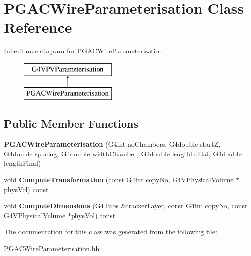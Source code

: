 \hypertarget{classPGACWireParameterisation}{\section{P\-G\-A\-C\-Wire\-Parameterisation Class Reference}
\label{classPGACWireParameterisation}
}
Inheritance diagram for P\-G\-A\-C\-Wire\-Parameterisation\-:\begin{figure}[H]
\begin{center}
\leavevmode
\includegraphics[height=2.000000cm]{classPGACWireParameterisation}
\end{center}
\end{figure}
\subsection*{Public Member Functions}
\begin{DoxyCompactItemize}
\item 
\hypertarget{classPGACWireParameterisation_a10d7eafe16d20cdc03db95db0e4fe153}{{\bfseries P\-G\-A\-C\-Wire\-Parameterisation} (G4int no\-Chambers, G4double start\-Z, G4double spacing, G4double width\-Chamber, G4double length\-Initial, G4double length\-Final)}\label{classPGACWireParameterisation_a10d7eafe16d20cdc03db95db0e4fe153}

\item 
\hypertarget{classPGACWireParameterisation_a5f44af81ac5b7be74e9ea2ca35e35d24}{void {\bfseries Compute\-Transformation} (const G4int copy\-No, G4\-V\-Physical\-Volume $\ast$phys\-Vol) const }\label{classPGACWireParameterisation_a5f44af81ac5b7be74e9ea2ca35e35d24}

\item 
\hypertarget{classPGACWireParameterisation_acb47b7dcd2f4227f08d14195d37b6b6d}{void {\bfseries Compute\-Dimensions} (G4\-Tubs \&tracker\-Layer, const G4int copy\-No, const G4\-V\-Physical\-Volume $\ast$phys\-Vol) const }\label{classPGACWireParameterisation_acb47b7dcd2f4227f08d14195d37b6b6d}

\end{DoxyCompactItemize}


The documentation for this class was generated from the following file\-:\begin{DoxyCompactItemize}
\item 
\hyperlink{PGACWireParameterisation_8hh}{P\-G\-A\-C\-Wire\-Parameterisation.\-hh}\end{DoxyCompactItemize}

